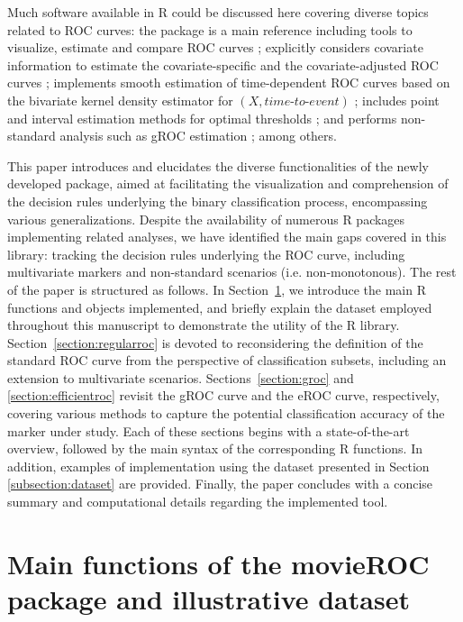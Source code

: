 Much software available in R could be discussed here covering diverse topics related to ROC curves:
the  package is a main reference including tools to visualize, estimate and compare ROC curves \citep{pROC2011};
 explicitly considers covariate information to estimate the covariate-specific and the covariate-adjusted ROC curves \citep{ROCnReg2021};
 implements smooth estimation of time-dependent ROC curves based on the bivariate kernel density estimator for $(X, \textit{time-to-event})$ \citep{DiazCoto2020};
 includes point and interval estimation methods for optimal thresholds \citep{OptimalCutpoints2014};
and  performs non-standard analysis such as gROC estimation \citep{nsROC2018}; among others.

This paper introduces and elucidates the diverse functionalities of the newly developed  package, aimed at facilitating the visualization and comprehension of the decision rules underlying the binary classification process, encompassing various generalizations. Despite the availability of numerous R packages implementing related analyses, we have identified the main gaps covered in this library: tracking the decision rules underlying the ROC curve, including multivariate markers and non-standard scenarios (i.e. non-monotonous). The rest of the paper is structured as follows. In Section~\ref{section:functionality}, we introduce the main R functions and objects implemented, and briefly explain the dataset employed throughout this manuscript to demonstrate the utility of the R library. Section~\ref{section:regularroc} is devoted to reconsidering the definition of the standard ROC curve from the perspective of classification subsets, including an extension to multivariate scenarios. Sections~\ref{section:groc} and \ref{section:efficientroc} revisit the gROC curve and the eROC curve, respectively, covering various methods to capture the potential classification accuracy of the marker under study.
Each of these sections begins with a state-of-the-art overview, followed by the main syntax of the corresponding R functions. In addition, examples of implementation using the dataset presented in Section \ref{subsection:dataset} are provided. Finally, the paper concludes with a concise summary and computational details regarding the implemented tool.





\section{Main functions of the movieROC package and illustrative dataset}\label{section:functionality}

